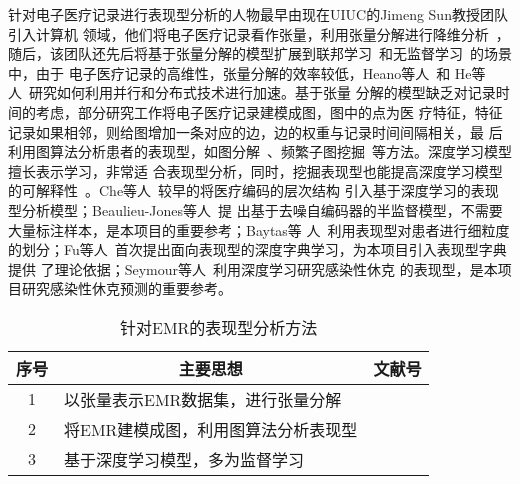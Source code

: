 针对电子医疗记录进行表现型分析的人物最早由现在UIUC的Jimeng Sun教授团队引入计算机
领域，他们将电子医疗记录看作张量，利用张量分解进行降维分析~，随后，该团队还先后将基于张量分解的模型扩展到联邦学习~和无监督学习~的场景中，由于
电子医疗记录的高维性，张量分解的效率较低，Heano等人~和
He等人~研究如何利用并行和分布式技术进行加速。基于张量
分解的模型缺乏对记录时间的考虑，部分研究工作将电子医疗记录建模成图，图中的点为医
疗特征，特征记录如果相邻，则给图增加一条对应的边，边的权重与记录时间间隔相关，最
后利用图算法分析患者的表现型，如图分解~、频繁子图挖掘~等方法。深度学习模型擅长表示学习，非常适
合表现型分析，同时，挖掘表现型也能提高深度学习模型的可解释性~。Che等人~较早的将医疗编码的层次结构
引入基于深度学习的表现型分析模型；Beaulieu-Jones等人~提
出基于去噪自编码器的半监督模型，不需要大量标注样本，是本项目的重要参考；Baytas等
人~利用表现型对患者进行细粒度的划分；Fu等人~首次提出面向表现型的深度字典学习，为本项目引入表现型字典提供
了理论依据；Seymour等人~利用深度学习研究感染性休克
的表现型，是本项目研究感染性休克预测的重要参考。

\begin{table}
    \renewcommand\arraystretch{1.5}
    \begin{small}
        \caption{针对EMR的表现型分析方法}
        \label{tab:phenotype}
        \begin{center}
            \begin{tabular}[c]{cll}
                \toprule
                \multicolumn{1}{c}{\textbf{序号}} &
                \multicolumn{1}{c}{\textbf{主要思想}} &
                \multicolumn{1}{c}{\textbf{文献号}}\\
                \midrule
                1 & 以张量表示EMR数据集，进行张量分解 &
                \cite{ho2014extracting} \cite{kim2017federated}
                \cite{perros2018sustain} \cite{heano2018parallel} \cite{he2019distributed}
                \cite{perros2019temporal} \\
                2 & 将EMR建模成图，利用图算法分析表现型 & \cite{liu2015temporal}
                \cite{wang2015graph} \cite{xu2017predicting} \\
                3 & 基于深度学习模型，多为监督学习 & \cite{kale2015causal}
                \cite{che2015deep}
                \cite{beaulieu2016semi} \cite{cheng2016risk}
                \cite{baytas2017patient} \cite{fu2019ddl} \cite{seymour2019derivation} \\
               \bottomrule
            \end{tabular}
        \end{center}
    \end{small}
\end{table}

